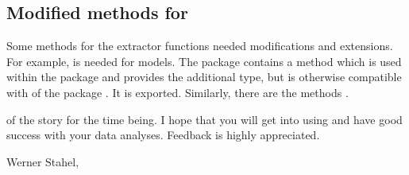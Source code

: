 \documentclass[11pt]{article}\usepackage[]{graphicx}\usepackage[]{color}
\begin{document}
\subsection{Modified methods for }
Some methods for the extractor functions 
needed modifications and extensions.
For example,  is needed for  models.
The package contains a method  which is used within the
package and provides the additional type, but is otherwise compatible with
 of the package . It is exported.
Similarly, there are the methods
.


{\small
{} of the story for the time being. I hope that you will
get into using  and have good success with your data analyses.
Feedback is highly appreciated.

Werner Stahel, 
}
\end{document}
